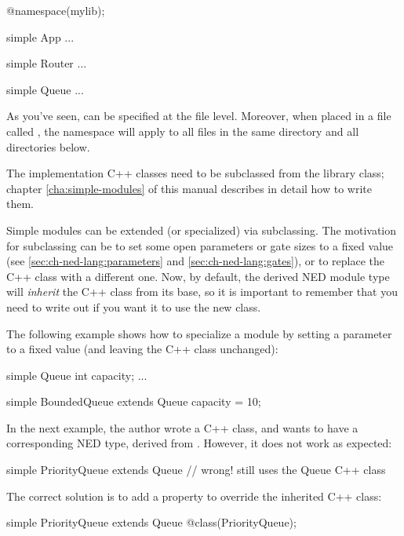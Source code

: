 \begin{ned}
@namespace(mylib);

simple App {
   ...
}

simple Router {
   ...
}

simple Queue {
   ...
}
\end{ned}

As you've seen,  can be specified at the file level. Moreover,
when placed in a file called , the namespace will apply to
all files in the same directory and all directories below.

The implementation C++ classes need to be subclassed from the
 library class; chapter \ref{cha:simple-modules} of
this manual describes in detail how to write them.

Simple modules can be extended (or specialized) via subclassing. The
motivation for subclassing can be to set some open parameters or gate sizes
to a fixed value (see \ref{sec:ch-ned-lang:parameters} and
\ref{sec:ch-ned-lang:gates}), or to replace the C++ class with a different
one. Now, by default, the derived NED module type will \textit{inherit} the
C++ class from its base, so it is important to remember that you need to
write out  if you want it to use the new class.

The following example shows how to specialize a module by setting a parameter
to a fixed value (and leaving the C++ class unchanged):

\begin{ned}
simple Queue
{
   int capacity;
   ...
}

simple BoundedQueue extends Queue
{
   capacity = 10;
}
\end{ned}

In the next example, the author wrote a  C++ class, and
wants to have a corresponding NED type, derived from . However,
it does not work as expected:

\begin{ned}
simple PriorityQueue extends Queue // wrong! still uses the Queue C++ class
{
}
\end{ned}

The correct solution is to add a  property to override the
inherited C++ class:

\begin{ned}
simple PriorityQueue extends Queue
{
   @class(PriorityQueue);
}
\end{ned}

